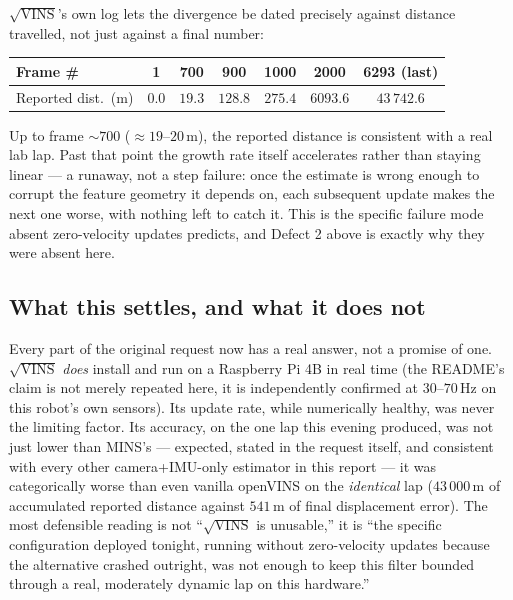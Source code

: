 $\sqrt{\text{VINS}}$'s own log lets the divergence be dated precisely
against distance travelled, not just against a final number:
\begin{center}
\begin{tabular}{@{}lcccccc@{}}
\toprule
Frame \# & 1 & 700 & 900 & 1000 & 2000 & 6293 (last) \\
\midrule
Reported dist.\ (m) & $0.0$ & $19.3$ & $128.8$ & $275.4$ & $6093.6$ & $43\,742.6$ \\
\bottomrule
\end{tabular}
\end{center}
Up to frame $\sim\!700$ ($\approx 19$--$20$\,m), the reported distance is
consistent with a real lab lap. Past that point the growth rate itself
accelerates rather than staying linear --- a runaway, not a step
failure: once the estimate is wrong enough to corrupt the feature
geometry it depends on, each subsequent update makes the next one
worse, with nothing left to catch it. This is the specific failure mode
absent zero-velocity updates predicts, and Defect 2 above is exactly
why they were absent here.

\subsection{What this settles, and what it does not}

Every part of the original request now has a real answer, not a
promise of one. $\sqrt{\text{VINS}}$ \emph{does} install and run on a
Raspberry Pi 4B in real time (the README's claim is not merely
repeated here, it is independently confirmed at $30$--$70\,\mathrm{Hz}$
on this robot's own sensors). Its update rate, while numerically
healthy, was never the limiting factor. Its accuracy, on the one lap
this evening produced, was not just lower than MINS's --- expected,
stated in the request itself, and consistent with every other
camera+IMU-only estimator in this report --- it was categorically worse
than even vanilla openVINS on the \emph{identical} lap ($43\,000$\,m of
accumulated reported distance against $541$\,m of final displacement
error). The most defensible reading is not ``$\sqrt{\text{VINS}}$ is
unusable,'' it is ``the specific configuration deployed tonight,
running without zero-velocity updates because the alternative crashed
outright, was not enough to keep this filter bounded through a real,
moderately dynamic lap on this hardware.''

